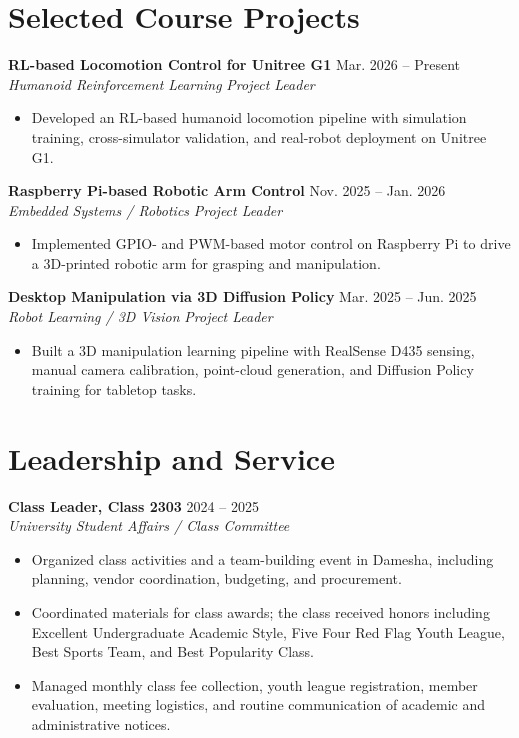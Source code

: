\documentclass[10pt,a4paper]{article}
\newcommand{\entry}[4]{%
  \textbf{#1} \hfill #2\\
  \textit{#3} \hfill \textit{#4}\\[-0.35em]
}
\newcommand{\cvitem}[1]{\item \small #1}
\begin{document}
\section*{Selected Course Projects}

\entry{RL-based Locomotion Control for Unitree G1}{Mar. 2026 -- Present}{Humanoid Reinforcement Learning}{Project Leader}
\begin{itemize}[leftmargin=1.2em, topsep=0.2em, itemsep=0.18em]
  \cvitem{Developed an RL-based humanoid locomotion pipeline with simulation training, cross-simulator validation, and real-robot deployment on Unitree G1.}
\end{itemize}

\entry{Raspberry Pi-based Robotic Arm Control}{Nov. 2025 -- Jan. 2026}{Embedded Systems / Robotics}{Project Leader}
\begin{itemize}[leftmargin=1.2em, topsep=0.2em, itemsep=0.18em]
  \cvitem{Implemented GPIO- and PWM-based motor control on Raspberry Pi to drive a 3D-printed robotic arm for grasping and manipulation.}
\end{itemize}

\entry{Desktop Manipulation via 3D Diffusion Policy}{Mar. 2025 -- Jun. 2025}{Robot Learning / 3D Vision}{Project Leader}
\begin{itemize}[leftmargin=1.2em, topsep=0.2em, itemsep=0.18em]
  \cvitem{Built a 3D manipulation learning pipeline with RealSense D435 sensing, manual camera calibration, point-cloud generation, and Diffusion Policy training for tabletop tasks.}
\end{itemize}

\section*{Leadership and Service}
\entry{Class Leader, Class 2303}{2024 -- 2025}{University Student Affairs / Class Committee}{}
\begin{itemize}[leftmargin=1.2em, topsep=0.2em, itemsep=0.18em]
  \cvitem{Organized class activities and a team-building event in Damesha, including planning, vendor coordination, budgeting, and procurement.}
  \cvitem{Coordinated materials for class awards; the class received honors including Excellent Undergraduate Academic Style, Five Four Red Flag Youth League, Best Sports Team, and Best Popularity Class.}
  \cvitem{Managed monthly class fee collection, youth league registration, member evaluation, meeting logistics, and routine communication of academic and administrative notices.}
\end{itemize}
\end{document}
